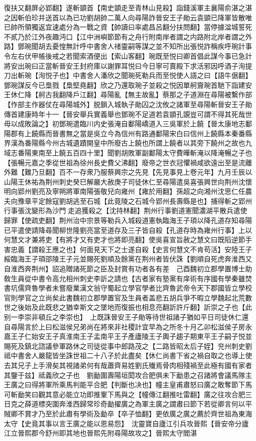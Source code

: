 復扶又翻屏必郢翻】遂斬顗首【南史顗走至青林山見殺】詣錢溪軍主襄陽俞湛之湛之因斬伯珍并送首以為已功劉胡帥二萬人向尋陽詐晉安王子勛云袁顗已降軍皆散唯已帥所領獨返宜速處分為一戰之資【帥讀曰率處昌呂翻分扶問翻】當停據湓城誓死不貳乃於江外夜趣沔口【江中洲嶼節節有之舟行附南岸者謂之内路附北岸者謂之外路】鄧琬聞胡去憂惶無計呼中書舍人禇靈嗣等謀之並不知所出張悦詐稱疾呼琬計事令左右伏甲帳後戒之若聞索酒便出【索山客翻】琬既至悦曰卿首倡此謀今事已急計將安出琬曰正當斬晉安王封府庫以謝罪耳悦曰今日寧可賣殿下求活邪因呼酒子洵提刀出斬琬【洵悦子也】中書舍人潘欣之聞琬死勒兵而至悦使人語之曰【語牛倨翻】鄧琬謀反今已梟戮【梟堅堯翻】欣之乃還取琬子並殺之悦因單舸齎琬首馳下詣建安王休仁降【舸古我翻降戶江翻】尋陽亂【無主故亂】蔡那之子道淵在尋陽被繫作部【作部主作器仗在尋陽城外】脱鎻入城執子勛囚之沈攸之諸軍至尋陽斬晉安王子勛傳首建康時年十一【晉安舉兵實義舉也鄧琬不足道若袁顗孔覬豈可謂不得其死哉世毋以成敗論之】初鄧琬遣臨川内史張淹自鄱陽嶠道入三吳軍於上饒【晉太康地志鄱陽郡有上饒縣而晉書無之當是吳立今為信州有路通鄱陽宋白曰信州上饒縣本秦番縣界漢為番陽縣今州古城遺蹟開皇中所廢古上饒也所謂上饒者以其旁下饒州之故也九域志番陽東南至上饒五百四十里】聞劉胡敗軍副鄱陽太守費曄斬淹以降淹暢之子也【張暢元嘉之季從世祖為徐州長史費父沸翻】廢帝之世衣冠懼禍咸欲遠出至是流離外難【難乃旦翻】百不一存衆乃服蔡興宗之先見【先見事見上卷元年】九月壬辰以山陽王休祐為荆州刺史癸巳解嚴大赦庚子司徒休仁至尋陽遣吳喜張興世向荆州沈懷明向郢州劉亮及寧朔將軍南陽張敬兒向雍州【雍於用翻】孫超之向湘州沈思仁任農夫向豫章平定餘寇劉胡逃至石城【此竟陵之石城今郢州長壽縣是也】捕得斬之郢州行事張沈變形為沙門走追獲殺之【沈持林翻】荆州行事劉道憲聞濃湖平散兵遣使歸罪【使疏吏翻】荆州治中宗景等勒兵入城殺道憲執臨海王子頊以降孔道存知尋陽已平遣使請降尋聞柳世隆劉亮當至道存及三子皆自殺【孔道存時為雍州行事】上以何慧文才兼將吏【有將才又有吏才也將即亮翻】使吳喜宣旨赦之慧文曰既䧟逆節手害忠義【謂殺王應之也】何面見天下之士遂自殺【史言何慧文不肯苟活】安陸王子綏臨海王子頊邵陵王子元並賜死劉順及餘黨在荆州者皆伏誅【劉順自死虎奔淮西又自淮西奔荆州】詔追贈諸死節之臣及封賞有功者各有差　己酉魏初立郡學置博士助敎生員從中書令高允相州刺史李訢之請也【古者家有塾黨有庠術有序國有學秦雖焚書坑儒齊魯學者未嘗廢業漢文翁守蜀起立學官學者比齊魯武帝令天下郡國皆立學校官則學官之立尚矣此書魏初立郡學置官及生員者盖悲五胡兵爭不暇立學魏起北荒數世之後始及此既悲之猶幸斯文之墜地而復振也相息亮翻訢許斤翻】訢崇之子也【此别一李崇非頓丘之李崇也】　上既誅晉安王子勛等待世祖諸子猶如平日司徒休仁還自尋陽言於上曰松滋侯兄弟尚在將來非社稷計宜早為之所冬十月乙卯松滋侯子房永嘉王子仁始安王子真淮南王子孟南平王子產廬陵王子輿子趨子期東平王子嗣子悦並賜死及鎮北諮議參軍路休之司徒從事中郎路茂之【二路皆昭太后子姪】兖州刺史劉祗中書舍人嚴龍皆坐誅世祖二十八子於此盡矣【休仁尚書下省之禍自取之也導上使去其兄子上手滑矣其視諸弟何有哉蕭齊易姓劉氏殱焉骨肉相殘禍至此極有國有家者其鑒于兹】祗義欣之子也　劉勔圍壽陽垣閎攻合肥俱未下勔患之召諸將會議馬隊主王廣之曰得將軍所乘馬判能平合肥【判斷也决也】幢主皇甫肅怒曰廣之敢奪節下馬可斬勔笑曰觀其意必能立功即推鞌下馬與之【幢傳江翻推吐雷翻】廣之往攻合肥三日克之薛道標突圍奔淮西歸常珍奇勔擢廣之為軍主廣之謂肅曰節下若從卿言何以平賊卿不賞才乃至於此肅有學術及勔卒【卒子恤翻】更依廣之廣之薦於齊世祖為東海太守【史竟其事以言王廣之能以恩易怨】　沈靈寶自廬江引兵攻晉熙【晉安帝分廬江立晉熙郡今舒州即其地也晉熙先附尋陽故攻之】晉熙太守閻湛